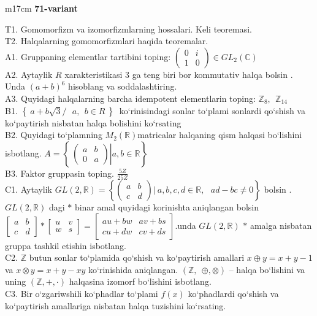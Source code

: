 \documentclass{article}
\begin{document}
\begin{tabular}{m{17cm}}
\textbf{71-variant}
\newline

T1. Gomomorfizm va izomorfizmlarning hossalari. Keli teoremasi. \\
T2. Halqalarning gomomorfizmlari haqida teoremalar. \\
A1. Gruppaning elementlar tartibini toping: \(\begin{pmatrix}
0 & i \\
1 & 0
\end{pmatrix} \in GL_{2}(\mathbb{C})\) \\
A2. Aytaylik \(R\) xarakteristikasi 3 ga teng biri bor kommutativ halqa bo\textquotesingle lsin . Unda \((a + b)^{6}\) hisoblang va soddalashtiring. \\
A3. Quyidagi halqalarning barcha idempotent elementlarin toping: \(\mathbb{Z}_{8},\ \ \mathbb{Z}_{14}\) \\
B1. \(\left\{ \left. \ a + b\sqrt{3}/\ \ \ a,\ \ b \in R\  \right\} \right.\ \) ko`rinisindagi sonlar to`plami sonlardi qo`shish va ko`paytirish nisbatan halqa bolishini ko`rsating \\
B2. Quyidagi to`plamning \(M_{2}(\mathbb{R})\)matricalar halqaning qism halqasi bo`lishini isbotlang. \(A = \left\{ \left. \ \begin{pmatrix}
a & b \\
0 & a
\end{pmatrix} \right|a,b\mathbb{\in R} \right\}\) \\
B3. Faktor gruppasin toping. \(\frac{5Z}{25Z}\) \\
C1. Aytaylik \(GL(2,\mathbb{R}) = \left\{ \begin{pmatrix}
a & b \\
c & d
\end{pmatrix}|\ a,b,c,d\mathbb{\in R},\ \ \ ad - bc \neq 0 \right\}\) bo\textquotesingle lsin . \(GL(2,\mathbb{R})\) dagi \(*\) binar amal quyidagi ko\textquotesingle rinishta aniqlangan bo\textquotesingle lsin \(\begin{bmatrix}
a & b \\
c & d
\end{bmatrix}*\begin{bmatrix}
u & v \\
w & s
\end{bmatrix} = \begin{bmatrix}
au + bw & av + bs \\
cu + dw & cv + ds
\end{bmatrix}\).unda \(GL(2,\mathbb{R})\) \(*\) amalga nisbatan gruppa tashkil etishin isbotlang. \\
C2. \(\mathbb{Z}\) butun sonlar to`plamida qo`shish va ko`paytirish amallari \(x \oplus y = x + y - 1\) va \(x \otimes y = x + y - xy\) ko`rinishida aniqlangan. \((\mathbb{Z},\ \  \oplus , \otimes )\) -- halqa bo`lishini va uning \((\mathbb{Z}, + , \cdot )\) halqasina izomorf bo`lishini isbotlang. \\
C3. Bir o`zgariwshili ko`phadlar to`plami \(f(x)\) ko`phadlardi qo`shish va ko`paytirish amallariga nisbatan halqa tuzishini ko`rsating. \\

\end{tabular}
\end{document}

